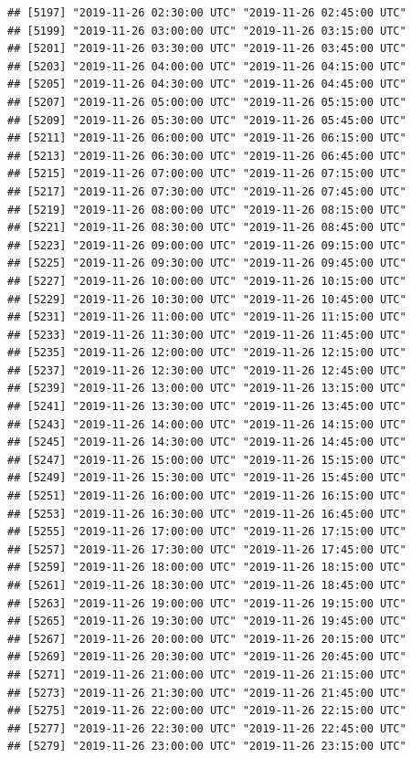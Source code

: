 \documentclass{article}\usepackage[]{graphicx}\usepackage[]{color}
\makeatletter
\newenvironment{kframe}{%
 \def\at@end@of@kframe{}%
 \ifinner\ifhmode%
  \def\at@end@of@kframe{\end{minipage}}%
  \begin{minipage}{\columnwidth}%
 \fi\fi%
 \def\FrameCommand##1{\hskip\@totalleftmargin \hskip-\fboxsep
 \colorbox{shadecolor}{##1}\hskip-\fboxsep
     \hskip-\linewidth \hskip-\@totalleftmargin \hskip\columnwidth}%
 \MakeFramed {\advance\hsize-\width
   \@totalleftmargin\z@ \linewidth\hsize
   \@setminipage}}%
 {\par\unskip\endMakeFramed%
 \at@end@of@kframe}
\newenvironment{knitrout}{}{} %
\makeatother
\begin{document}
\begin{knitrout}
\begin{kframe}
\begin{verbatim}
## [5197] "2019-11-26 02:30:00 UTC" "2019-11-26 02:45:00 UTC"
## [5199] "2019-11-26 03:00:00 UTC" "2019-11-26 03:15:00 UTC"
## [5201] "2019-11-26 03:30:00 UTC" "2019-11-26 03:45:00 UTC"
## [5203] "2019-11-26 04:00:00 UTC" "2019-11-26 04:15:00 UTC"
## [5205] "2019-11-26 04:30:00 UTC" "2019-11-26 04:45:00 UTC"
## [5207] "2019-11-26 05:00:00 UTC" "2019-11-26 05:15:00 UTC"
## [5209] "2019-11-26 05:30:00 UTC" "2019-11-26 05:45:00 UTC"
## [5211] "2019-11-26 06:00:00 UTC" "2019-11-26 06:15:00 UTC"
## [5213] "2019-11-26 06:30:00 UTC" "2019-11-26 06:45:00 UTC"
## [5215] "2019-11-26 07:00:00 UTC" "2019-11-26 07:15:00 UTC"
## [5217] "2019-11-26 07:30:00 UTC" "2019-11-26 07:45:00 UTC"
## [5219] "2019-11-26 08:00:00 UTC" "2019-11-26 08:15:00 UTC"
## [5221] "2019-11-26 08:30:00 UTC" "2019-11-26 08:45:00 UTC"
## [5223] "2019-11-26 09:00:00 UTC" "2019-11-26 09:15:00 UTC"
## [5225] "2019-11-26 09:30:00 UTC" "2019-11-26 09:45:00 UTC"
## [5227] "2019-11-26 10:00:00 UTC" "2019-11-26 10:15:00 UTC"
## [5229] "2019-11-26 10:30:00 UTC" "2019-11-26 10:45:00 UTC"
## [5231] "2019-11-26 11:00:00 UTC" "2019-11-26 11:15:00 UTC"
## [5233] "2019-11-26 11:30:00 UTC" "2019-11-26 11:45:00 UTC"
## [5235] "2019-11-26 12:00:00 UTC" "2019-11-26 12:15:00 UTC"
## [5237] "2019-11-26 12:30:00 UTC" "2019-11-26 12:45:00 UTC"
## [5239] "2019-11-26 13:00:00 UTC" "2019-11-26 13:15:00 UTC"
## [5241] "2019-11-26 13:30:00 UTC" "2019-11-26 13:45:00 UTC"
## [5243] "2019-11-26 14:00:00 UTC" "2019-11-26 14:15:00 UTC"
## [5245] "2019-11-26 14:30:00 UTC" "2019-11-26 14:45:00 UTC"
## [5247] "2019-11-26 15:00:00 UTC" "2019-11-26 15:15:00 UTC"
## [5249] "2019-11-26 15:30:00 UTC" "2019-11-26 15:45:00 UTC"
## [5251] "2019-11-26 16:00:00 UTC" "2019-11-26 16:15:00 UTC"
## [5253] "2019-11-26 16:30:00 UTC" "2019-11-26 16:45:00 UTC"
## [5255] "2019-11-26 17:00:00 UTC" "2019-11-26 17:15:00 UTC"
## [5257] "2019-11-26 17:30:00 UTC" "2019-11-26 17:45:00 UTC"
## [5259] "2019-11-26 18:00:00 UTC" "2019-11-26 18:15:00 UTC"
## [5261] "2019-11-26 18:30:00 UTC" "2019-11-26 18:45:00 UTC"
## [5263] "2019-11-26 19:00:00 UTC" "2019-11-26 19:15:00 UTC"
## [5265] "2019-11-26 19:30:00 UTC" "2019-11-26 19:45:00 UTC"
## [5267] "2019-11-26 20:00:00 UTC" "2019-11-26 20:15:00 UTC"
## [5269] "2019-11-26 20:30:00 UTC" "2019-11-26 20:45:00 UTC"
## [5271] "2019-11-26 21:00:00 UTC" "2019-11-26 21:15:00 UTC"
## [5273] "2019-11-26 21:30:00 UTC" "2019-11-26 21:45:00 UTC"
## [5275] "2019-11-26 22:00:00 UTC" "2019-11-26 22:15:00 UTC"
## [5277] "2019-11-26 22:30:00 UTC" "2019-11-26 22:45:00 UTC"
## [5279] "2019-11-26 23:00:00 UTC" "2019-11-26 23:15:00 UTC"

\end{verbatim}
\end{kframe}
\end{knitrout}
\end{document}
